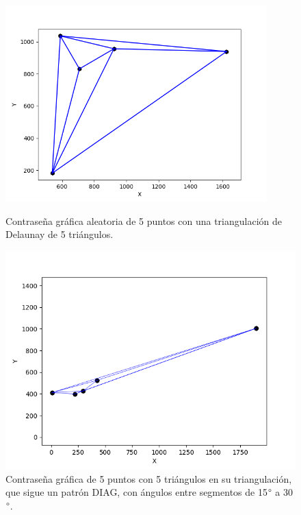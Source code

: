 \documentclass[12pt]{report}
\begin{document}
	\begin{figure}[h]
	\centering
	\begin{minipage}[t]{0.45\textwidth}
		\centering
		\includegraphics[width=0.9\textwidth]{alea5td.png}
		\caption{Contraseña gráfica aleatoria de 5 puntos con una triangulación de Delaunay de 5 triángulos.}
		\label{5TD}
		
	\end{minipage}\hfill
	\begin{minipage}[t]{0.45\textwidth}
		\centering
		\includegraphics[width=0.9\linewidth]{5td30.png}  %
		\caption{Contraseña gráfica de 5 puntos con 5 triángulos en su triangulación, que sigue un patrón DIAG, con ángulos entre segmentos de 15$\degree$ a 30$\degree$.}
		\label{5td30}
	\end{minipage}
\end{figure}
\end{document}
